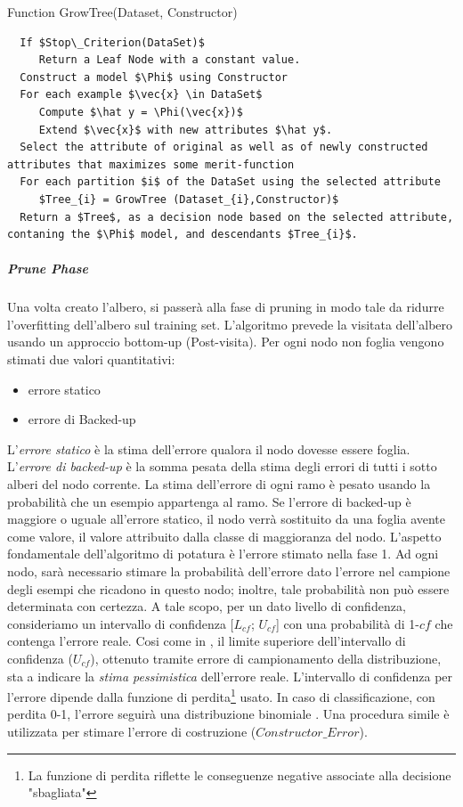 \lstset{style=customAlg}
\begin{algorithm}
	\caption{Function GrowTree(Dataset, Constructor)}
	\begin{lstlisting}
  If $Stop\_Criterion(DataSet)$
     Return a Leaf Node with a constant value.
  Construct a model $\Phi$ using Constructor
  For each example $\vec{x} \in DataSet$
     Compute $\hat y = \Phi(\vec{x})$
     Extend $\vec{x}$ with new attributes $\hat y$.
  Select the attribute of original as well as of newly constructed attributes that maximizes some merit-function
  For each partition $i$ of the DataSet using the selected attribute
     $Tree_{i} = GrowTree (Dataset_{i},Constructor)$
  Return a $Tree$, as a decision node based on the selected attribute, contaning the $\Phi$ model, and descendants $Tree_{i}$.
	\end{lstlisting}
\end{algorithm}

\subparagraph{Prune Phase}
	Una volta creato l'albero, si passerà alla fase di pruning in modo tale da ridurre l'overfitting dell'albero sul training set. L'algoritmo prevede la visitata dell'albero usando un approccio bottom-up (Post-visita). Per ogni nodo non foglia vengono stimati due valori quantitativi: 
\begin{itemize}
	\item errore statico
	\item errore di Backed-up
\end{itemize}
L'\emph{errore statico} è la stima dell'errore qualora il nodo dovesse essere foglia.
L'\emph{errore di backed-up} è la somma pesata della stima degli errori di tutti i sotto alberi del nodo corrente. La stima dell'errore di ogni ramo è pesato usando la probabilità che un esempio appartenga al ramo. Se l'errore di backed-up è maggiore o uguale all'errore statico, il nodo verrà sostituito da una foglia avente come valore, il valore attribuito dalla classe di maggioranza del nodo. L'aspetto fondamentale dell'algoritmo di potatura è l'errore stimato nella fase 1. Ad ogni nodo, sarà necessario stimare la probabilità dell'errore dato l'errore nel campione degli esempi che ricadono in questo nodo; inoltre, tale probabilità non può essere determinata con certezza. A tale scopo, per un dato livello di confidenza, consideriamo un intervallo di confidenza [$L_{cf}$; $U_{cf}$] con una probabilità di 1-$cf$ che contenga l'errore reale. Cosi come in \cite{Quinlan:1993a}, il limite superiore dell'intervallo di confidenza ($U_{cf}$), ottenuto tramite errore di campionamento della distribuzione, sta a indicare la \emph{stima pessimistica} dell'errore reale. L'intervallo di confidenza per l'errore dipende dalla funzione di perdita\footnote{ La funzione di perdita riflette le conseguenze negative associate alla decisione "sbagliata"} usato. In caso di classificazione, con perdita 0-1, l'errore seguirà una distribuzione binomiale \cite{mitchellbook}.
Una procedura simile è utilizzata per stimare l'errore di costruzione ($Constructor\_Error$).

